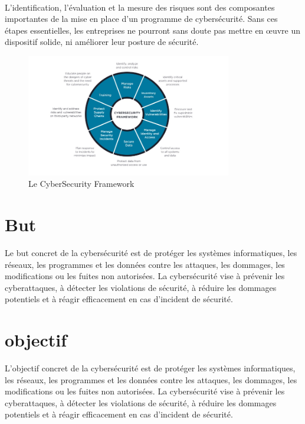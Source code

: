   \paragraph{ }
  L’identification, l’évaluation et la mesure des risques sont des composantes importantes de la mise en place d’un programme de cybersécurité. Sans ces étapes essentielles, les entreprises ne pourront sans doute pas mettre en œuvre un dispositif solide, ni améliorer leur posture de sécurité.
  \begin{figure}[h]
  	 \begin{center}
  	 		\includegraphics[width=0.8\textwidth]{PhotoMemoire/image_oeuvre.png}
  	 		\caption{Le CyberSecurity Framework \cite{15} }
  	 \end{center}
  \end{figure}
  
 \section{But}
 Le but concret de la cybersécurité est de protéger les systèmes informatiques, les réseaux, les programmes et les données contre les attaques, les dommages, les modifications ou les fuites non autorisées. La cybersécurité vise à prévenir les cyberattaques, à détecter les violations de sécurité, à réduire les dommages potentiels et à réagir efficacement en cas d'incident de sécurité.\\
 \section{objectif}
 L'objectif concret de la cybersécurité est de protéger les systèmes informatiques, les réseaux, les programmes et les données contre les attaques, les dommages, les modifications ou les fuites non autorisées. La cybersécurité vise à prévenir les cyberattaques, à détecter les violations de sécurité, à réduire les dommages potentiels et à réagir efficacement en cas d'incident de sécurité.\\
